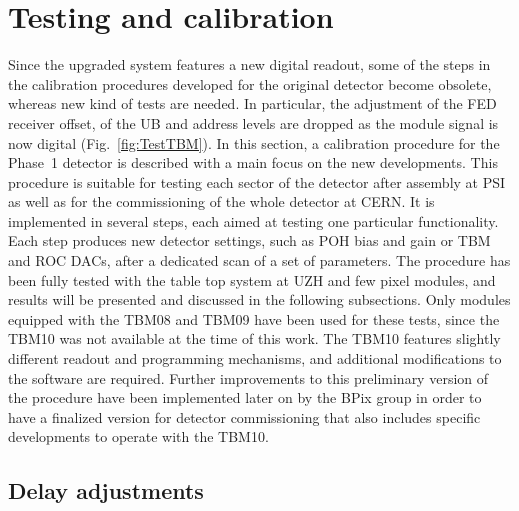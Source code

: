 \section{Testing and calibration}\label{sec:Phase1Calib}

Since the upgraded system features a new digital readout, some of the steps in the calibration procedures developed for the original detector become obsolete, whereas new kind of tests are needed.
In particular, the adjustment of the FED receiver offset, of the UB and address levels are dropped as the module signal is now digital (Fig.~\ref{fig:TestTBM}).
In this section, a calibration procedure for the Phase~1 detector is described with a main focus on the new developments.
This procedure is suitable for testing each sector of the detector after assembly at PSI as well as for the commissioning of the whole detector at CERN.
It is implemented in several steps, each aimed at testing one particular functionality. 
Each step produces new detector settings, such as POH bias and gain or TBM and ROC DACs, after a dedicated scan of a set of parameters.
The procedure has been fully tested with the table top system at UZH and few pixel modules, and results will be presented and discussed in the following subsections.
Only modules equipped with the TBM08 and TBM09 have been used for these tests,
since the TBM10 was not available at the time of this work.
The TBM10 features slightly different readout and programming mechanisms, and additional modifications to the software are required.
Further improvements to this preliminary version of the procedure have been implemented later on by the BPix group in order to have a finalized version for detector commissioning
that also includes specific developments to operate with the TBM10.

\subsection{Delay adjustments}\label{subsec:TBMPLLROCDelays}

